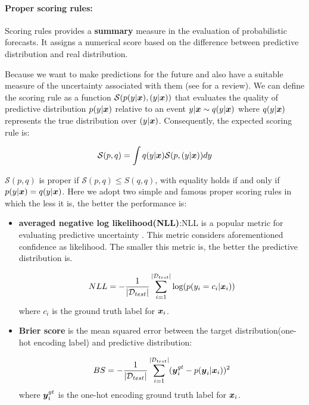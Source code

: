 \paragraph{Proper scoring rules:} 
Scoring rules provides a \textbf{summary} measure in the evaluation of probabilistic forecasts. It assigns a numerical score based on the difference between predictive distribution and real distribution. 

Because we want to make predictions for the future and also have a suitable measure of the uncertainty associated with them (see \cite{gneiting2007strictly} for a review). We can define the scoring rule as a function $\mathcal S(p(y|\boldsymbol x), (y|\boldsymbol x))$ that evaluates the quality of predictive distribution $p(y|\boldsymbol x)$ relative to an event $y|\boldsymbol x \sim q(y|\boldsymbol x)$ where $q(y|\boldsymbol x)$ represents the true distribution over $(y|\boldsymbol x)$. Consequently, the expected scoring rule is:

\begin{equation}\label{scoring rule}
	\mathcal S(p, q) = \int q(y| \boldsymbol x) \mathcal S(p,(y|\boldsymbol x))dy
\end{equation}

$\mathcal S(p,q)$ is proper if $\mathcal S(p,q) \leq S(q,q)$, with equality holds if and only if $p(y|\boldsymbol x) = q(y|\boldsymbol x)$. Here we adopt two simple and famous proper scoring rules in which the less it is, the better the performance is:
\begin{itemize}
	\item \textbf{averaged negative log likelihood(NLL)}:NLL is a popular metric for evaluating predictive uncertainty	\cite{quinonero2005evaluating}. This metric considers aforementioned confidence as likelihood. The smaller this metric is, the better the predictive distribution is.
	
	\begin{equation} \label{nll}
		NLL = -\frac{1}{|\mathcal D_{test}|}\sum_{i=1}^{|\mathcal D_{test}|}\text{log}(p(y_i = c_i|\boldsymbol x_i))
	\end{equation}
	where $c_i$ is the ground truth label for $\boldsymbol x_i$.	
	\item \textbf{Brier score} is the mean squared error between the target distribution(one-hot encoding label) and predictive distribution:
	
	\begin{equation} \label{bs}
	BS = -\frac{1}{|\mathcal D_{test}|}\sum_{i=1}^{|\mathcal D_{test}|}(\boldsymbol y^{gt}_i - p(\boldsymbol y_i|\boldsymbol x_i))^2
	\end{equation}
	where $\boldsymbol y^{gt}_i$ is the one-hot encoding ground truth label for $\boldsymbol x_i$. 
	
\end{itemize}

